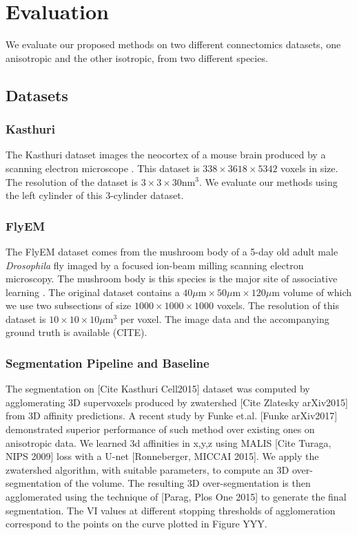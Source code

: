 \section{Evaluation}

We evaluate our proposed methods on two different connectomics datasets, one anisotropic and the other isotropic, from two different species. 

\subsection{Datasets}
\label{sec:dataset}
\subsubsection{Kasthuri}
The Kasthuri dataset images the neocortex of a mouse brain produced by a scanning electron microscope \cite{kasthuri2015saturated}. 
This dataset is $338 \times 3618 \times  5342$ voxels in size. 
The resolution of the dataset is $3 \times 3 \times 30 \textrm{nm}^3$. 
We evaluate our methods using the left cylinder of this 3-cylinder dataset. 

\subsubsection{FlyEM}

The FlyEM dataset comes from the mushroom body of a 5-day old adult male \textit{Drosophila} fly imaged by a focused ion-beam milling scanning electron microscopy.  
The mushroom body is this species is the major site of associative learning \cite{takemura2017connectome}. 
The original dataset contains a $40 \mu\textrm{m} \times 50\mu\textrm{m} \times 120\mu\textrm{m}$ volume of which we use two subsections of size $1000 \times 1000 \times 1000$ voxels.  
The resolution of this dataset is $10 \times 10 \times 10 \mu\textrm{m}^3$ per voxel. 
The image data and the accompanying ground truth is available (CITE). 

\subsubsection{Segmentation Pipeline and Baseline}
\label{sec:neuroproof}
The segmentation on [Cite Kasthuri Cell2015] dataset was computed by agglomerating 3D supervoxels produced by zwatershed [Cite Zlatesky arXiv2015] from 3D affinity predictions. 
A recent study by Funke et.al. [Funke arXiv2017] demonstrated superior performance of such method over existing ones on anisotropic data. 
We learned 3d affinities in x,y,z using MALIS [Cite Turaga, NIPS 2009] loss with a U-net [Ronneberger, MICCAI 2015]. 
We apply the zwatershed algorithm, with suitable parameters, to compute an 3D over-segmentation of the volume. 
The resulting 3D over-segmentation is then agglomerated using the technique of [Parag, Plos One 2015] to generate the final segmentation. The VI values at different stopping thresholds of agglomeration correspond to the points on the curve plotted in Figure YYY.

